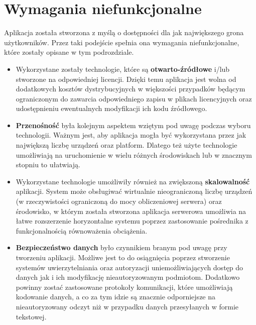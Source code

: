 \section{Wymagania niefunkcjonalne}
Aplikacja została stworzona z myślą o dostępności dla jak największego grona użytkowników.
Przez taki podejście spełnia ona wymagania niefunkcjonalne, które zostały opisane w tym podrozdziale.
\begin{itemize}
  \item Wykorzystane zostały technologie, które są \textbf{otwarto-źródłowe} i/lub stworzone na odpowiedniej
    licencji. Dzięki temu aplikacja jest wolna od dodatkowych kosztów dystrybucyjnych w większości
    przypadków będącym ograniczonym do zawarcia odpowiedniego zapisu w plikach licencyjnych oraz
    udostępnieniu ewentualnych modyfikacji ich kodu źródłowego.
  \item \textbf{Przenośność} była kolejnym aspektem wziętym pod uwagę podczas wyboru technologii. Ważnym jest,
    aby aplikacja mogła być wykorzystana przez jak największą liczbę urządzeń oraz platform. Dlatego też
    użyte technologie umożliwiają na uruchomienie w wielu różnych środowiskach lub w znacznym stopniu to ułatwiają.
  \item Wykorzystane technologie umożliwiły również na zwiększoną \textbf{skalowalność} aplikacji. System może
    obsługiwać wirtualnie nieograniczoną liczbę urządzeń (w rzeczywistości ograniczoną do mocy obliczeniowej serwera)
    oraz środowisko, w którym została stworzona aplikacja serwerowa umożliwia na łatwe rozszerzenie horyzontalne
    systemu poprzez zastosowanie pośrednika z funkcjonalnością równoważenia obciążenia.
  \item \textbf{Bezpieczeństwo danych} było czynnikiem branym pod uwagę przy tworzeniu aplikacji. 
    Możliwe jest to do osiągnięcia poprzez stworzenie systemów uwierzytelniania oraz autoryzacji uniemożliwiających
    dostęp do danych jak i ich modyfikację nieautoryzowanym podmiotom. Dodatkowo powinny zostać zastosowane
    protokoły komunikacji, które umożliwiają kodowanie danych, a co za tym idzie są znacznie odporniejsze
    na nieautoryzowany odczyt niż w przypadku danych przesyłanych w formie tekstowej.
\end{itemize}

